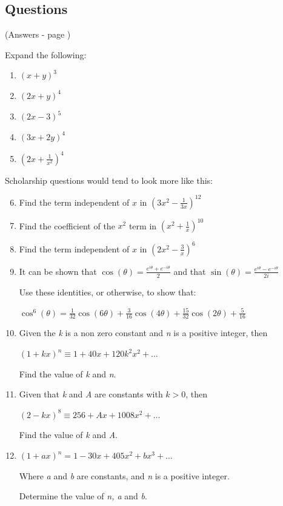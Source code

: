 \documentclass[../main.tex]{subfiles}
\begin{document}
\pagebreak
\hypertarget{binomialexpansionlink}{\subsection*{Questions}}
(Answers - page {\pageref*{Binomial expansion answers}})
\label{Binomial Expansion}

Expand the following:

\begin{enumerate}
    \item \( (x+y)^3 \)
    \item \( (2x+y)^4 \)
    \item \( (2x-3)^5 \)
    \item \( (3x+2y)^4 \)
    \item \( (2x + \frac{1}{x^2 } )^4 \)
\end{enumerate}

Scholarship questions would tend to look more like this:

\begin{enumerate}
    \setcounter{enumi}{5}
    \item Find the term independent of \( x \) in \( (3x^2 - \frac{1}{3x})^{12}  \)
    \item Find the coefficient of the \( x^2 \) term in \( (x^2 + \frac{1}{x})^{10} \)
    \item Find the term independent of \( x \) in \( (2x^2 - \frac{3}{x})^6 \)
    \item It can be shown that \( \cos(\theta) = \frac{e^{i\theta}+e^{-i\theta}}{2}\) and that \( \sin(\theta) = \frac{e^{i\theta}-e^{-i\theta}}{2i}\)
   
    Use these identities, or otherwise, to show that:

    \( \cos^6(\theta) = \frac{1}{32}\cos(6\theta) + \frac{3}{16}\cos(4\theta)+\frac{15}{32}\cos(2\theta)+\frac{5}{16}\)

    \item Given the \textit{k} is a non zero constant and \textit{n} is a positive integer, then
    
    \( (1+kx)^n \equiv 1+40x+120k^2x^2+\dots\)

    Find the value of \textit{k} and \textit{n}.

    \item Given that \textit{k} and \textit{A} are constants with \(k>0\), then
    
    \( (2-kx)^8 \equiv 256+Ax+1008x^2+\dots\)

    Find the value of \textit{k} and \textit{A}.

    \item \( (1+ax)^n = 1-30x+405x^2+bx^3+\dots \)
    
    Where \textit{a} and \textit{b} are constants, and \textit{n} is a positive integer.

    Determine the value of \textit{n, a} and \textit{b}.
\end{enumerate}
\end{document}
